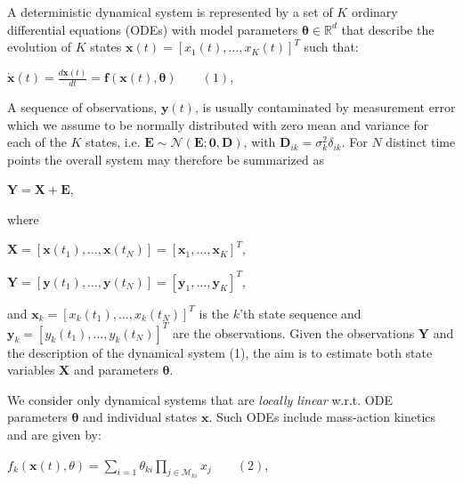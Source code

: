 \begin{par}
A deterministic dynamical system is represented by a set of $K$ ordinary differential equations (ODEs) with model parameters $\boldsymbol\theta \in \mathbb{R}^d$ that describe the evolution of $K$ states $\mathbf{x}(t) = [x_1(t),\ldots, x_K(t)]^T$ such that:
\end{par} \vspace{1em}
\begin{par}
$\dot{\mathbf{x}}(t) = \frac{d \mathbf{x}(t)}{d t} = \mathbf{f}(\mathbf{x}(t),\boldsymbol\theta) \qquad (1)$,
\end{par} \vspace{1em}
\begin{par}
A sequence of observations, $\mathbf{y}(t)$, is usually contaminated by measurement error which we assume to be normally distributed with zero mean and variance for each of the $K$ states, i.e. $\mathbf{E}\sim\mathcal{N}(\mathbf{E};\mathbf{0},\mathbf{D})$, with $\mathbf{D}_{ik}=\sigma_k ^2 \delta_{ik}$. For $N$ distinct time points the overall system may therefore be summarized as
\end{par} \vspace{1em}
\begin{par}
$\mathbf{Y} = \mathbf{X} + \mathbf{E}$,
\end{par} \vspace{1em}
\begin{par}
where
\end{par} \vspace{1em}
\begin{par}
$\mathbf{X} = [\mathbf{x}(t_1),\ldots,\mathbf{x}(t_N)] =  [\mathbf{x}_1,\ldots,\mathbf{x}_K]^T$,
\end{par} \vspace{1em}
\begin{par}
$\mathbf{Y} = [\mathbf{y}(t_1),\ldots,\mathbf{y}(t_N)] =  [\mathbf{y}_1,\ldots,\mathbf{y}_K]^T$,
\end{par} \vspace{1em}
\begin{par}
and $\mathbf{x}_k = [x_k(t_1),\ldots,x_k(t_N)]^T$ is the $k$'th state sequence and $\mathbf{y}_k = [y_k(t_1),\ldots,y_k(t_N)]^T$ are the observations. Given the observations $\mathbf{Y}$ and the description of the dynamical system (1), the aim is to estimate both state variables $\mathbf{X}$ and parameters $\boldsymbol\theta$.
\end{par} \vspace{1em}
\begin{par}
We consider only dynamical systems that are \textit{locally linear} w.r.t. ODE parameters $\boldsymbol\theta$ and individual states $\mathbf{x}$. Such ODEs include mass-action kinetics and are given by:
\end{par} \vspace{1em}
\begin{par}
$f_{k}(\mathbf{x}(t),\theta) = \sum_{i=1} \theta_{ki} \prod_{j \in\mathcal{M}_{ki}} x_j \qquad (2)$,
\end{par} \vspace{1em}

